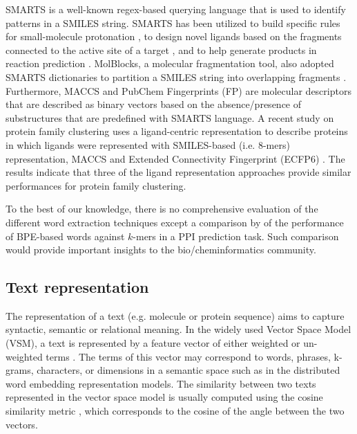 \documentclass[review]{elsarticle}
\begin{document}
SMARTS is a well-known regex-based querying language that is used to identify patterns in a SMILES string. SMARTS has been utilized to build specific rules for small-molecule protonation \cite{ropp2019dimorphite}, to design novel ligands based on the fragments connected to the active site of a target \cite{cheron2015opengrowth}, and to help generate products in reaction prediction \cite{wei2016neural}. MolBlocks, a molecular fragmentation tool, also adopted SMARTS dictionaries to partition a SMILES string into overlapping fragments \cite{ghersi2014molblocks}. Furthermore, MACCS \cite{durant2002reoptimization} and PubChem \cite{bolton2008pubchem} Fingerprints (FP) are molecular descriptors that are described as binary vectors based on the absence/presence of substructures that are predefined with SMARTS language. A recent study on protein family clustering uses a ligand-centric representation to describe proteins in which ligands were represented with SMILES-based (i.e. 8-mers) representation, MACCS and Extended Connectivity Fingerprint (ECFP6) \cite{ozturk2018novel}. The results indicate that three of the ligand representation approaches provide similar performances for protein family clustering.

To the best of our knowledge, there is no comprehensive evaluation of the different word extraction techniques except a comparison by \citet{wang2019high} of the performance of BPE-based words against $k$-mers in a PPI prediction task. Such comparison would provide important insights to the bio/cheminformatics community.  

\subsection{Text representation}

The representation of a text (e.g. molecule or protein sequence) aims to capture syntactic, semantic or relational meaning. In the widely used Vector Space Model (VSM), a text is represented by a feature vector of either weighted or un-weighted terms \cite{salton1975vector}. The terms of this vector may correspond to words, phrases, k-grams, characters, or dimensions in a semantic space such as in the distributed word embedding representation models. The similarity between two texts represented in the vector space model is usually computed using the cosine similarity metric \cite{bilenko2003adaptive}, which corresponds to the cosine of the angle between the two vectors. 
\end{document}
